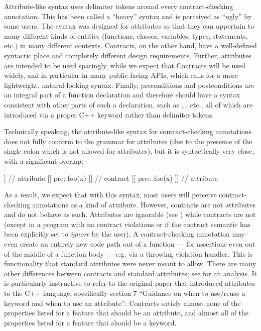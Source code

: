 Attribute-like syntax uses \tcode{[[...]]} delimiter tokens around every contract-checking annotation. This has been called a ``heavy'' syntax and is  perceived as ``ugly'' by some users. The \tcode{[[...]]} syntax was designed for attributes so that they can appertain to many different kinds of entities (functions, classes, variables, types, statements, etc.) in many different contexts. Contracts, on the other hand, have a well-defined syntactic place and completely different design requirements. Further, attributes are intended to be used sparingly, while we expect that Contracts will be used widely, and in particular in many public-facing APIs, which calls for a more lightweight, natural-looking syntax. Finally, preconditions and postconditions are an integral part of a function declaration and therefore should have a syntax consistent with other parts of such a declaration, such as , , etc., all of which are introduced via a proper C++ keyword rather than delimiter tokens.

Technically speaking, the attribute-like syntax for contract-checking annotations does not fully conform to the grammar for attributes (due to the presence of the single colon which is not allowed for attributes), but it is syntactically very close, with a significant overlap:

\begin{codeblock}
[[ pre(foo(x)) ]]  // attribute
[[ pre: foo(x) ]]  // contract
[[ pre:: foo(x) ]] // attribute
\end{codeblock}

As a result, we expect that with this syntax, most users will perceive contract-checking annotations as a kind of attribute. However, contracts are not attributes and do not behave as such. Attributes are ignorable (see \cite{P2552R3}) while contracts are not (except in a program with no contract violations or if the contract semantic has been explicitly set to \emph{ignore} by the user). A contract-checking annotation may even create an entirely new code path out of a function --- for assertions even out of the middle of a function body --- e.g. via a throwing violation handler. This is functionality that standard attributes were never meant to allow. There are many other differences between contracts and standard attributes; see \cite{P2487R1} for an analysis. It is particularly instructive to refer to the original paper \cite{N2761} that introduced attributes to the C++ language, specifically section 7 ``Guidance on when to use/reuse a keyword and when to use an attribute'': Contracts satisfy almost none of the properties listed for a feature that should be an attribute, and almost all of the properties listed for a feature that should be a keyword.

